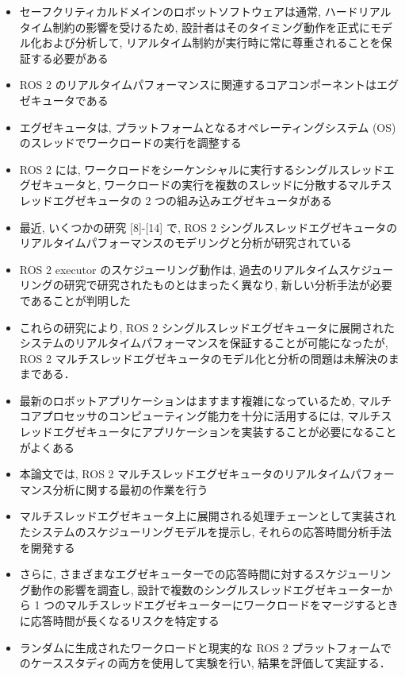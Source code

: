 \begin{frame}{}
    \begin{itemize}
        \item セーフクリティカルドメインのロボットソフトウェアは通常, ハードリアルタイム制約の影響を受けるため, 設計者はそのタイミング動作を正式にモデル化および分析して, リアルタイム制約が実行時に常に尊重されることを保証する必要がある
        \item ROS 2 のリアルタイムパフォーマンスに関連するコアコンポーネントはエグゼキュータである
        \item エグゼキュータは, プラットフォームとなるオペレーティングシステム (OS) のスレッドでワークロードの実行を調整する
        \item ROS 2 には, ワークロードをシーケンシャルに実行するシングルスレッドエグゼキュータと, ワークロードの実行を複数のスレッドに分散するマルチスレッドエグゼキュータの 2 つの組み込みエグゼキュータがある
        \item 最近, いくつかの研究 [8]-[14] で, ROS 2 シングルスレッドエグゼキュータのリアルタイムパフォーマンスのモデリングと分析が研究されている
        \item ROS 2 executor のスケジューリング動作は, 過去のリアルタイムスケジューリングの研究で研究されたものとはまったく異なり, 新しい分析手法が必要であることが判明した
        \item これらの研究により, ROS 2 シングルスレッドエグゼキュータに展開されたシステムのリアルタイムパフォーマンスを保証することが可能になったが, ROS 2 マルチスレッドエグゼキュータのモデル化と分析の問題は未解決のままである．
    \end{itemize}
\end{frame}

\begin{frame}{}
    \begin{itemize}
        \item 最新のロボットアプリケーションはますます複雑になっているため, マルチコアプロセッサのコンピューティング能力を十分に活用するには, マルチスレッドエグゼキュータにアプリケーションを実装することが必要になることがよくある
        \item 本論文では, ROS 2 マルチスレッドエグゼキュータのリアルタイムパフォーマンス分析に関する最初の作業を行う
        \item マルチスレッドエグゼキュータ上に展開される処理チェーンとして実装されたシステムのスケジューリングモデルを提示し, それらの応答時間分析手法を開発する
        \item さらに, さまざまなエグゼキューターでの応答時間に対するスケジューリング動作の影響を調査し, 設計で複数のシングルスレッドエグゼキューターから 1 つのマルチスレッドエグゼキューターにワークロードをマージするときに応答時間が長くなるリスクを特定する
        \item ランダムに生成されたワークロードと現実的な ROS 2 プラットフォームでのケーススタディの両方を使用して実験を行い, 結果を評価して実証する．
    \end{itemize}
\end{frame}
